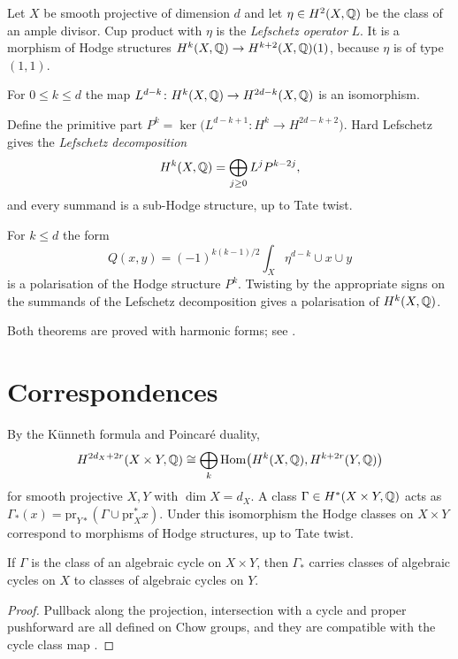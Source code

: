 Let $X$ be smooth projective of dimension $d$ and let $\eta\in H^{2}(X,\mathbb{Q})$
be the class of an ample divisor. Cup product with $\eta$ is the
\emph{Lefschetz operator} $L$. It is a morphism of Hodge structures
$H^{k}(X,\mathbb{Q})\to H^{k+2}(X,\mathbb{Q})(1)$, because $\eta$ is of type $(1,1)$.

\begin{theorem}\label{thm:hardlefschetz}
For $0\le k\le d$ the map $L^{d-k}\colon H^{k}(X,\mathbb{Q})\to H^{2d-k}(X,\mathbb{Q})$ is
an isomorphism.
\end{theorem}

Define the primitive part $P^{k}=\ker\bigl(L^{d-k+1}\colon H^{k}\to
H^{2d-k+2}\bigr)$. Hard Lefschetz gives the \emph{Lefschetz decomposition}
\[
  H^{k}(X,\mathbb{Q})=\bigoplus_{j\ge0}L^{j}P^{k-2j},
\]
and every summand is a sub-Hodge structure, up to Tate twist.

\begin{theorem}\label{thm:hodgeriemann}
For $k\le d$ the form
\[
  Q(x,y)=(-1)^{k(k-1)/2}\int_{X}\eta^{d-k}\cup x\cup y
\]
is a polarisation of the Hodge structure $P^{k}$. Twisting by the
appropriate signs on the summands of the Lefschetz decomposition gives a
polarisation of $H^{k}(X,\mathbb{Q})$.
\end{theorem}

Both theorems are proved with harmonic forms; see \cite[Chapter~6]{Voi02}.

\section{Correspondences}

By the K\"unneth formula and Poincar\'e duality,
\[
  H^{2d_{X}+2r}(X\times Y,\mathbb{Q})\cong\bigoplus_{k}\operatorname{Hom}\bigl(H^{k}(X,\mathbb{Q}),
  H^{k+2r}(Y,\mathbb{Q})\bigr)
\]
for smooth projective $X,Y$ with $\dim X=d_{X}$. A class
$\Gamma\in H^{*}(X\times Y,\mathbb{Q})$ acts as
$\Gamma_{*}(x)=\mathrm{pr}_{Y*}(\Gamma\cup\mathrm{pr}_{X}^{*}x)$. Under this
isomorphism the Hodge classes on $X\times Y$ correspond to morphisms of
Hodge structures, up to Tate twist.

\begin{proposition}\label{prop:corr}
If $\Gamma$ is the class of an algebraic cycle on $X\times Y$, then
$\Gamma_{*}$ carries classes of algebraic cycles on $X$ to classes of
algebraic cycles on $Y$.
\end{proposition}

\begin{proof}
Pullback along the projection, intersection with a cycle and proper
pushforward are all defined on Chow groups, and they are compatible with
the cycle class map \cite[Chapter~19]{Ful98}.
\end{proof}

